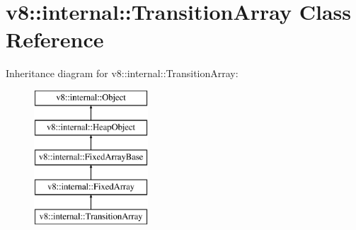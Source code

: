 \hypertarget{classv8_1_1internal_1_1_transition_array}{}\section{v8\+:\+:internal\+:\+:Transition\+Array Class Reference}
\label{classv8_1_1internal_1_1_transition_array}
Inheritance diagram for v8\+:\+:internal\+:\+:Transition\+Array\+:\begin{figure}[H]
\begin{center}
\leavevmode
\includegraphics[height=5.000000cm]{classv8_1_1internal_1_1_transition_array}
\end{center}
\end{figure}

